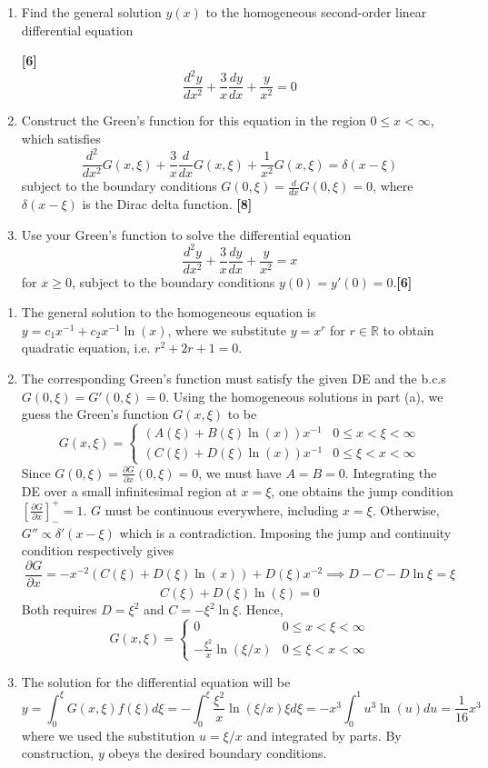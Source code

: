 \documentclass[a4paper]{article}
\begin{document}
\newpage
\begin{qns}\leavevmode
\begin{enumerate}[label=(\alph*)]
\item Find the general solution $y(x)$ to the homogeneous second-order linear differential equation 

\hfill \textbf{[6]}
$$\frac{d^2y}{dx^2}+\frac{3}{x}\frac{dy}{dx}+\frac{y}{x^2}=0$$
\item Construct the Green's function for this equation in the region $0\leq x<\infty$, which satisfies
$$\frac{d^2}{dx^2}G(x,\xi)+\frac{3}{x}\frac{d}{dx}G(x,\xi)+\frac{1}{x^2}G(x,\xi)=\delta(x-\xi)$$
subject to the boundary conditions $G(0,\xi)=\frac{d}{dx}G(0,\xi)=0$, where $\delta(x-\xi)$ is the Dirac delta function. \hfill \textbf{[8]}
\item Use your Green's function to solve the differential equation
$$\frac{d^2y}{dx^2}+\frac{3}{x}\frac{dy}{dx}+\frac{y}{x^2}=x$$
for $x\geq0$, subject to the boundary conditions $y(0)=y'(0)=0$.\hfill \textbf{[6]}
\end{enumerate}
\end{qns}
\begin{ans}\leavevmode
\begin{enumerate}[label=(\alph*)]
\item The general solution to the homogeneous equation is $y=c_1x^{-1}+c_2x^{-1}\ln(x)$, where we substitute $y=x^r$ for $r\in\mathbb{R}$ to obtain quadratic equation, i.e. $r^2+2r+1=0$.
\item The corresponding Green's function must satisfy the given DE and the b.c.s $G(0,\xi)=G'(0,\xi)=0$. Using the homogeneous solutions in part (a), we guess the Green's function $G(x,\xi)$ to be
$$G(x,\xi)=
\left\{
        \begin{array}{ll}
      (A(\xi)+B(\xi)\ln(x))x^{-1}& 0\leq x<\xi<\infty \\
      (C(\xi)+D(\xi)\ln(x))x^{-1} & 0\leq\xi<x<\infty
        \end{array}
    \right.$$
Since $G(0,\xi)=\frac{\partial G}{\partial x}(0,\xi)=0$, we must have $A=B=0$. Integrating the DE over a small infinitesimal region at $x=\xi$, one obtains the jump condition $[\frac{\partial G}{\partial x}]_-^+=1$. $G$ must be continuous everywhere, including $x=\xi$. Otherwise, $G''\propto\delta'(x-\xi)$ which is a contradiction. Imposing the jump and continuity condition respectively gives
$$\frac{\partial G}{\partial x}=-x^{-2}(C(\xi)+D(\xi)\ln(x))+D(\xi)x^{-2}\implies D-C-D\ln\xi=\xi$$
$$C(\xi)+D(\xi)\ln(\xi)=0$$
Both requires $D=\xi^2$ and $C=-\xi^2\ln\xi$. Hence, $$G(x,\xi)=
\left\{
        \begin{array}{ll}
      0& 0\leq x<\xi<\infty \\
      -\frac{\xi^2}{x}\ln(\xi/x) & 0\leq\xi<x<\infty
        \end{array}
    \right.$$
\item The solution for the differential equation will be
$$y=\int_0^\xi G(x,\xi)f(\xi)d\xi=-\int_0^\xi\frac{\xi^2}{x}\ln(\xi/x)\xi d\xi=-x^3\int_0^1u^3\ln(u)du=\frac{1}{16}x^3$$
where we used the substitution $u=\xi/x$ and integrated by parts. By construction, $y$ obeys the desired boundary conditions.
\end{enumerate}
\end{ans}
\end{document}
